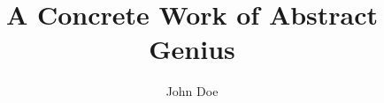 \title{A Concrete Work of Abstract Genius}
\author{John Doe}
\dissertation                             %
\doctorphilosophy                      %
\apma                                 %
\maygrad                            %
\def\gradyear{2014}

